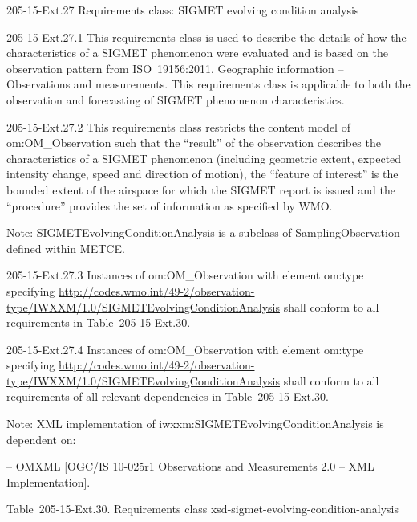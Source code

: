 205-15-Ext.27 Requirements class: SIGMET evolving condition analysis

205-15-Ext.27.1 This requirements class is used to describe the details of how the characteristics of a SIGMET phenomenon were evaluated and is based on the observation pattern from ISO~19156:2011, Geographic information -- Observations and measurements. This requirements class is applicable to both the observation and forecasting of SIGMET phenomenon characteristics.

205-15-Ext.27.2 This requirements class restricts the content model of om:OM\_Observation such that the ``result'' of the observation describes the characteristics of a SIGMET phenomenon (including geometric extent, expected intensity change, speed and direction of motion), the ``feature of interest'' is the bounded extent of the airspace for which the SIGMET report is issued and the ``procedure'' provides the set of information as specified by WMO.

Note: SIGMETEvolvingConditionAnalysis is a subclass of SamplingObservation defined within METCE.

205-15-Ext.27.3 Instances of om:OM\_Observation with element om:type specifying \url{http://codes.wmo.int/49-2/observation-type/IWXXM/1.0/SIGMETEvolvingConditionAnalysis} shall conform to all requirements in Table~205-15-Ext.30.

205-15-Ext.27.4 Instances of om:OM\_Observation with element om:type specifying \url{http://codes.wmo.int/49-2/observation-type/IWXXM/1.0/SIGMETEvolvingConditionAnalysis} shall conform to all requirements of all relevant dependencies in Table~205-15-Ext.30.

Note: XML implementation of iwxxm:SIGMETEvolvingConditionAnalysis is dependent on:

-- OMXML {[}OGC/IS 10-025r1 Observations and Measurements 2.0 -- XML Implementation{]}.

Table~205-15-Ext.30. Requirements class xsd-sigmet-evolving-condition-analysis

